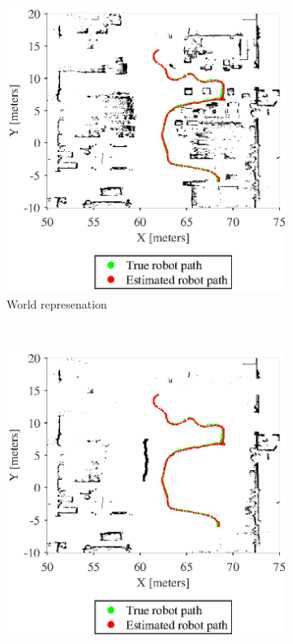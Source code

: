 \begin{figure}
	\centering
	\begin{subfigure}[b]{0.45\textwidth}
		\includegraphics[width=\textwidth]{figures/static_mapping/map_with_poses}
		\caption{World represenation}
		\label{fig:simulated_robot_estimate_total}
	\end{subfigure}
	~ %
	\begin{subfigure}[b]{0.45\textwidth}
		\includegraphics[width=\textwidth]{figures/static_mapping/amcl_map_with_poses}

\end{subfigure}
\end{figure}
